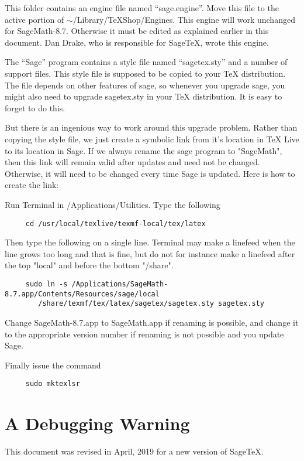 \documentclass[11pt, oneside]{amsart}
\begin{document}
This folder contains an engine file named ``sage.engine''. Move this file to the active portion of $\sim$/Library/TeXShop/Engines. This engine will work unchanged for SageMath-8.7. Otherwise it must be edited as explained earlier in this document. Dan Drake, who is responsible for SageTeX, wrote this engine.

The ``Sage'' program contains a style file named ``sagetex.sty'' and a number of support files. This style file is supposed to be copied to your TeX distribution. The file depends on other features of sage, so whenever you upgrade sage, you might also need to upgrade sagetex.sty in your TeX distribution. It is easy to forget to do this.

But there is an ingenious way to work around this upgrade problem. Rather than copying the style file, we just
create a symbolic link from it's location in TeX Live to its location in Sage. If we always rename the sage program to "SageMath", then this link will remain valid after updates and need not be changed. Otherwise, it will need to be changed every time Sage is updated. Here is how to create the link:

Run Terminal in /Applications/Utilities. Type the following
\begin{verbatim}
     cd /usr/local/texlive/texmf-local/tex/latex
\end{verbatim}
Then type the following on a single line. Terminal may make a linefeed when
the line  grows too long and that is fine, but do not for instance make a linefeed
after the top "local" and before the bottom "/share".
\begin{verbatim}
     sudo ln -s /Applications/SageMath-8.7.app/Contents/Resources/sage/local
        /share/texmf/tex/latex/sagetex/sagetex.sty sagetex.sty
\end{verbatim}

Change SageMath-8.7.app to SageMath.app if renaming is possible, and change it to the appropriate version number if renaming is not possible and you update Sage.

Finally issue the command
\begin{verbatim}		
     sudo mktexlsr
\end{verbatim}
	
\section{A Debugging Warning}

This document was revised in April, 2019 for a new version of SageTeX. 
\end{document}
